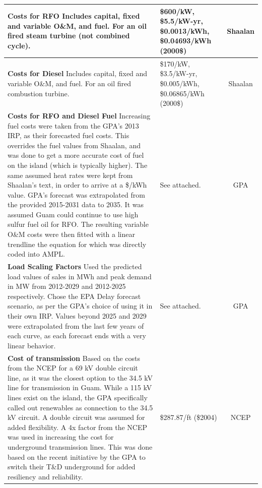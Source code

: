 \documentclass[12pt,letterpaper,fleqn]{article}
\makeatletter
\newcommand{\spc}[2][l]{%
  \begin{tabular}[#1]{@{}l@{}}#2\end{tabular}}
\makeatother
\begin{document}
\begin{center}
\begin{longtable}{| p{11cm} | p{3cm} | c | }
    \textbf{Costs for RFO} Includes capital, fixed and variable O\&M,
    and fuel. For an oil fired steam turbine (not combined cycle). 
    & \spc{\$600/kW,\\\$5.5/kW-yr,\\\$0.0013/kWh,\\\$0.04693/kWh\\(2000\$)}
    & Shaalan \cite{shaalan01} 
    \\\hline

    \textbf{Costs for Diesel} Includes capital, fixed and variable
    O\&M, and fuel. For an oil fired combustion turbine. 
    & \spc{\$170/kW,\\\$3.5/kW-yr,\\\$0.005/kWh,\\\$0.06865/kWh\\(2000\$)}
    & Shaalan \cite{shaalan01} 
    \\\hline

    \textbf{Costs for RFO and Diesel Fuel} Increasing fuel costs were
    taken from the GPA's 2013 IRP, as their forecasted fuel
    costs. This overrides the fuel values from Shaalan, and was done
    to get a more accurate cost of fuel on the island (which is
    typically higher). The same assumed heat rates were kept from
    Shaalan's text, in order to arrive at a \$/kWh value. GPA's
    forecast was extrapolated from the provided 2015-2031 data to
    2035. It was assumed Guam could continue to use high sulfur fuel
    oil for RFO. The resulting variable O\&M costs were then fitted
    with a linear trendline the equation for which was directly coded
    into AMPL. 
    & See attached. 
    & GPA \cite{cruz13} 
    \\\hline

    \textbf{Load Scaling Factors} Used the predicted load values of
    sales in MWh and peak demand in MW from 2012-2029 and 2012-2025
    respectively. Chose the EPA Delay forecast scenario, as per the
    GPA's choice of using it in their own IRP. Values beyond 2025 and
    2029 were extrapolated from the last few years of each curve, as
    each forecast ends with a very linear behavior. 
    & See attached. 
    & GPA \cite{cruz13} 
    \\\hline

    \textbf{Cost of transmission} Based on the costs from the NCEP for
    a 69 kV double circuit line, as it was the closest option to the
    34.5 kV line for transmission in Guam. While a 115 kV lines exist
    on the island, the GPA specifically called out renewables as
    connection to the 34.5 kV circuit. A double circuit was assumed
    for added flexibility. A 4x factor from the NCEP was used in
    increasing the cost for underground transmission lines. This was
    done based on the recent initiative by the GPA to switch their
    T\&D underground for added resiliency and reliability. 
    & \$287.87/ft (\$2004)
    & NCEP \cite{brown04} 
    \\\hline


\end{longtable}
\end{center}
\end{document}
